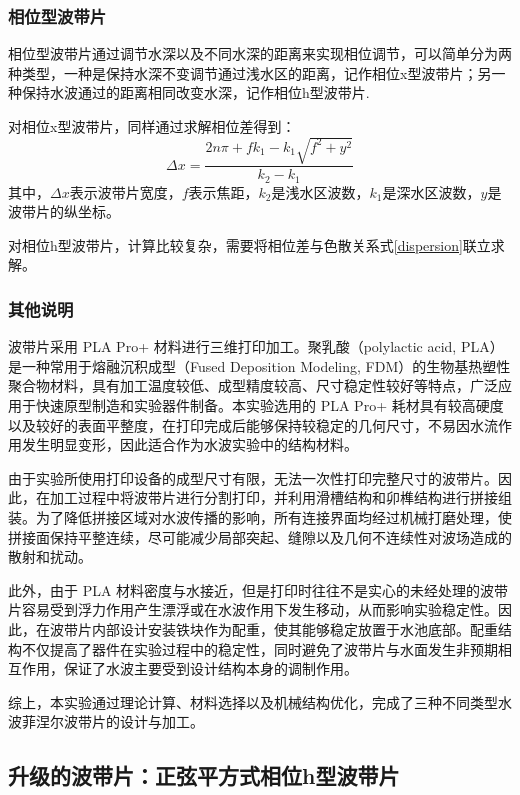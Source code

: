 \documentclass[11pt,a4paper]{ctexart}
\begin{document}
\subsubsection{相位型波带片}
相位型波带片通过调节水深以及不同水深的距离来实现相位调节，可以简单分为两种类型，一种是保持水深不变调节通过浅水区的距离，记作相位x型波带片；另一种保持水波通过的距离相同改变水深，记作相位h型波带片.

对相位x型波带片，同样通过求解相位差得到：
\begin{equation}
\Delta x = \frac{2n\pi+fk_1-k_1\sqrt{f^2+y^2}}{k_2-k_1}
\end{equation}
其中，$\Delta x$表示波带片宽度，$f$表示焦距，$k_2$是浅水区波数，$k_1$是深水区波数，$y$是波带片的纵坐标。

对相位h型波带片，计算比较复杂，需要将相位差与色散关系式\eqref{dispersion}联立求解。



\subsubsection{其他说明}

波带片采用 PLA Pro+ 材料进行三维打印加工。聚乳酸（polylactic acid, PLA）是一种常用于熔融沉积成型（Fused Deposition Modeling, FDM）的生物基热塑性聚合物材料，具有加工温度较低、成型精度较高、尺寸稳定性较好等特点，广泛应用于快速原型制造和实验器件制备\cite{Penumakala2020}。本实验选用的 PLA Pro+ 耗材具有较高硬度以及较好的表面平整度，在打印完成后能够保持较稳定的几何尺寸，不易因水流作用发生明显变形，因此适合作为水波实验中的结构材料。

由于实验所使用打印设备的成型尺寸有限，无法一次性打印完整尺寸的波带片。因此，在加工过程中将波带片进行分割打印，并利用滑槽结构和卯榫结构进行拼接组装。为了降低拼接区域对水波传播的影响，所有连接界面均经过机械打磨处理，使拼接面保持平整连续，尽可能减少局部突起、缝隙以及几何不连续性对波场造成的散射和扰动。

此外，由于 PLA 材料密度与水接近，但是打印时往往不是实心的未经处理的波带片容易受到浮力作用产生漂浮或在水波作用下发生移动，从而影响实验稳定性。因此，在波带片内部设计安装铁块作为配重，使其能够稳定放置于水池底部。配重结构不仅提高了器件在实验过程中的稳定性，同时避免了波带片与水面发生非预期相互作用，保证了水波主要受到设计结构本身的调制作用。

综上，本实验通过理论计算、材料选择以及机械结构优化，完成了三种不同类型水波菲涅尔波带片的设计与加工。


\subsection{升级的波带片：正弦平方式相位h型波带片}
\end{document}
